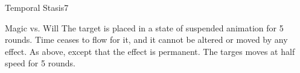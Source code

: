 \begin{spellsection}{Temporal Stasis}{7}
    \begin{spellheader}
    \end{spellheader}
    \begin{spellcontent}
        \begin{spelltargetinginfo}
        \end{spelltargetinginfo}
        \begin{spelleffects}
            \begin{spellattack}{Magic vs. Will}
                \spellsuccess The target is placed in a state of suspended animation for 5 rounds. Time ceases to flow for it, and it cannot be altered or moved by any effect.
                \spellcritical As above, except that the effect is permanent.
                \spellfailure The targes moves at half speed for 5 rounds.
            \end{spellattack}
        \end{spelleffects}
    \end{spellcontent}
    \begin{spellfooter}
        \miscastrandom
    \end{spellfooter}
\end{spellsection}

